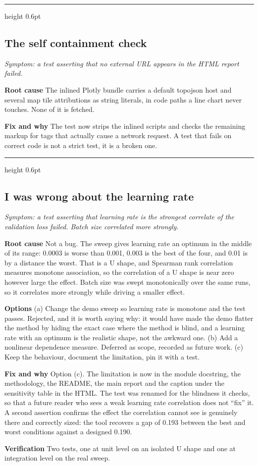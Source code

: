 \documentclass[11pt,a4paper]{article}
\newcommand{\entry}[2]{%
  \vspace{0.6em}%
  {\color{rulegrey}\hrule height 0.6pt}%
  \vspace{0.5em}%
  \subsection*{#1}%
  \textit{\small #2}\par\vspace{0.3em}%
}
\newcommand{\field}[1]{\vspace{0.35em}\textbf{#1}\quad}
\begin{document}
\entry{The self containment check}{Symptom: a test asserting that no external URL
appears in the HTML report failed.}

\field{Root cause} The inlined Plotly bundle carries a default topojson host and
several map tile attributions as string literals, in code paths a line chart
never touches. None of it is fetched.

\field{Fix and why} The test now strips the inlined scripts and checks the
remaining markup for tags that actually cause a network request. A test that
fails on correct code is not a strict test, it is a broken one.

\entry{I was wrong about the learning rate}{Symptom: a test asserting that
learning rate is the strongest correlate of the validation loss failed. Batch
size correlated more strongly.}

\field{Root cause} Not a bug. The sweep gives learning rate an optimum in the
middle of its range: 0.0003 is worse than 0.001, 0.003 is the best of the four,
and 0.01 is by a distance the worst. That is a U shape, and Spearman rank
correlation measures monotone association, so the correlation of a U shape is
near zero however large the effect. Batch size was swept monotonically over the
same runs, so it correlates more strongly while driving a smaller effect.

\field{Options} (a) Change the demo sweep so learning rate is monotone and the
test passes. Rejected, and it is worth saying why: it would have made the demo
flatter the method by hiding the exact case where the method is blind, and a
learning rate with an optimum is the realistic shape, not the awkward one.
(b) Add a nonlinear dependence measure. Deferred as scope, recorded as future
work. (c) Keep the behaviour, document the limitation, pin it with a test.

\field{Fix and why} Option (c). The limitation is now in the module docstring,
the methodology, the README, the main report and the caption under the
sensitivity table in the HTML. The test was renamed for the blindness it checks,
so that a future reader who sees a weak learning rate correlation does not
``fix'' it. A second assertion confirms the effect the correlation cannot see is
genuinely there and correctly sized: the tool recovers a gap of 0.193 between the
best and worst conditions against a designed 0.190.

\field{Verification} Two tests, one at unit level on an isolated U shape and one
at integration level on the real sweep.
\end{document}

